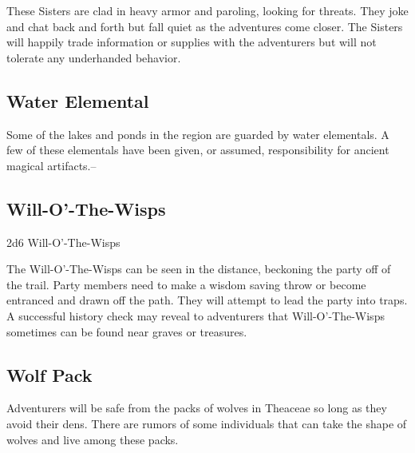 These Sisters are clad in heavy armor and paroling, looking for threats.
They joke and chat back and forth but fall quiet as the adventures come closer.
The Sisters will happily trade information or supplies with the adventurers but will not tolerate any underhanded behavior.

\subsection{Water Elemental}

Some of the lakes and ponds in the region are guarded by water elementals.
A few of these elementals have been given, or assumed, responsibility for ancient magical artifacts.--

\subsection{Will-O'-The-Wisps}

2d6 Will-O'-The-Wisps

The Will-O'-The-Wisps can be seen in the distance, beckoning the party off of the trail.
Party members need to make a wisdom saving throw or become entranced and drawn off the path.
They will attempt to lead the party into traps.
A successful history check may reveal to adventurers that Will-O'-The-Wisps sometimes can be found near graves or treasures.

\subsection{Wolf Pack}

Adventurers will be safe from the packs of wolves in Theaceae so long as they avoid their dens.
There are rumors of some individuals that can take the shape of wolves and live among these packs.
